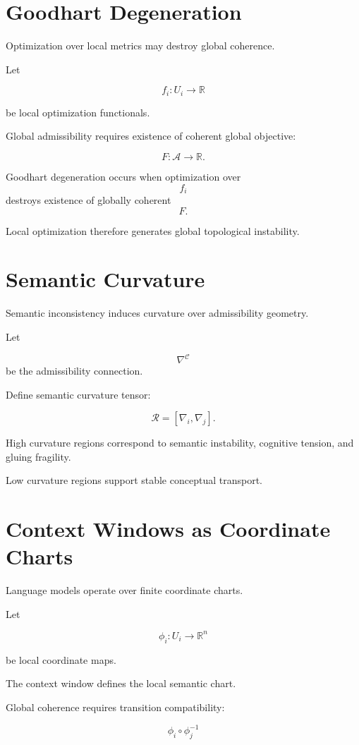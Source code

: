 \documentclass[12pt,openany]{book}
\theoremstyle{plain}
\theoremstyle{definition}
\theoremstyle{remark}
\begin{document}
\section{Goodhart Degeneration}

Optimization over local metrics may destroy global coherence.

Let

\[
f_i
:
U_i\to\mathbb{R}
\]

be local optimization functionals.

Global admissibility requires existence of coherent global
objective:

\[
F
:
\mathcal{A}\to\mathbb{R}.
\]

Goodhart degeneration occurs when optimization over
\[
f_i
\]
destroys existence of globally coherent
\[
F.
\]

Local optimization therefore generates global topological
instability.

\section{Semantic Curvature}

Semantic inconsistency induces curvature over admissibility
geometry.

Let

\[
\nabla^\mathcal{C}
\]
be the admissibility connection.

Define semantic curvature tensor:

\[
\mathcal{R}
=
[\nabla_i,\nabla_j].
\]

High curvature regions correspond to semantic instability,
cognitive tension, and gluing fragility.

Low curvature regions support stable conceptual transport.

\section{Context Windows as Coordinate Charts}

Language models operate over finite coordinate charts.

Let

\[
\phi_i :
U_i\to\mathbb{R}^n
\]

be local coordinate maps.

The context window defines the local semantic chart.

Global coherence requires transition compatibility:

\[
\phi_i\circ\phi_j^{-1}
\]
\end{document}
